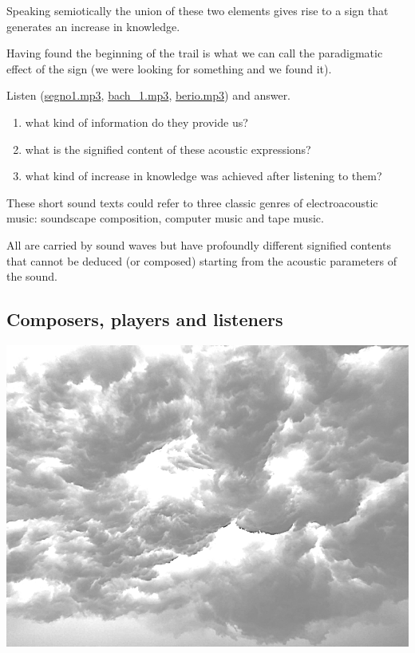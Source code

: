 Speaking semiotically the union of these two elements gives rise to a sign that generates an increase in knowledge.

Having found the beginning of the trail is what we can call the paradigmatic effect of the sign (we were looking for something and we found it).

Listen (\href{URL}{segno1.mp3}, \href{URL}{bach\_1.mp3}, \href{URL}{berio.mp3}) and answer.

\begin{enumerate}
\def\labelenumi{\arabic{enumi}.}
\tightlist
\item what kind of information do they provide us?
\item what is the signified content of these acoustic expressions?
\item what kind of increase in knowledge was achieved after listening to them?
\end{enumerate}

These short sound texts could refer to three classic genres of electroacoustic music: soundscape composition, computer music and tape music.

All are carried by sound waves but have profoundly different signified contents that cannot be deduced (or composed) starting from the acoustic parameters of the sound.

\subsection{Composers, players and listeners }\label{composers-players-and-listeners}

\begin{center}
\includegraphics[scale=0.4]{../img/nuvole.png}
\end{center}

